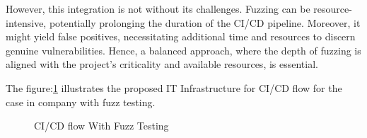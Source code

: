 However, this integration is not without its challenges. Fuzzing can be
resource-intensive, potentially prolonging the duration of the CI/CD pipeline.
Moreover, it might yield false positives, necessitating additional time and
resources to discern genuine vulnerabilities. Hence, a balanced approach,
where the depth of fuzzing is aligned with the project's criticality and
available resources, is essential\cite{FuzzingC40:online}.

\pagebreak
The figure:\ref{fig:CI_Infrastrcuture_fuzz_2} illustrates the proposed
IT Infrastructure for CI/CD flow for the case in company with fuzz testing.

\begin{figure}[H]
        \centering
        \caption{CI/CD flow With Fuzz Testing}\label{fig:CI_Infrastrcuture_fuzz_2}
\end{figure}

\clearpage